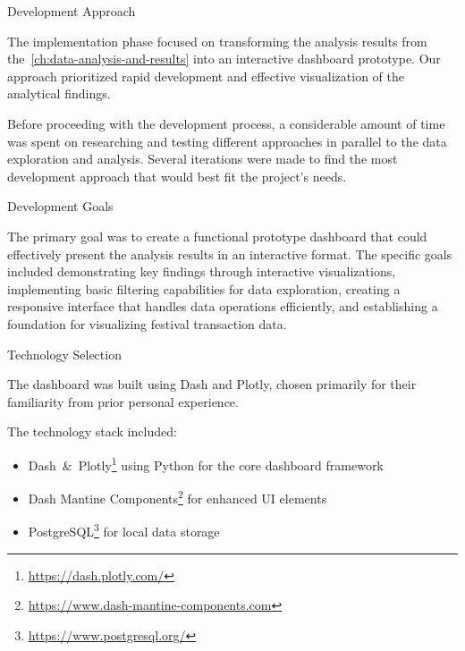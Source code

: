 \begin{section}{Development Approach}
	\label{sec:implementation-development-approach}

	The implementation phase focused on transforming the analysis results from the~\autoref{ch:data-analysis-and-results} into an interactive dashboard prototype.
	Our approach prioritized rapid development and effective visualization of the analytical findings.

	Before proceeding with the development process, a considerable amount of time was spent on researching and testing different approaches in parallel to the data exploration and analysis.
	Several iterations were made to find the most development approach that would best fit the project's needs.

	\begin{subsection}{Development Goals}
		\label{subsec:implementation-development-approach-goals}

		The primary goal was to create a functional prototype dashboard that could effectively present the analysis results in an interactive format.
		The specific goals included demonstrating key findings through interactive visualizations, implementing basic filtering capabilities for data exploration,
		creating a responsive interface that handles data operations efficiently, and establishing a foundation for visualizing festival transaction data.
	\end{subsection}

	\begin{subsection}{Technology Selection}
		\label{subsec:implementation-development-approach-technology}

		The dashboard was built using Dash and Plotly, chosen primarily for their familiarity from prior personal experience.

		The technology stack included:
		\begin{itemize}
			\item Dash~\&~Plotly\footnote{\url{https://dash.plotly.com/}} using Python for the core dashboard framework
			\item Dash Mantine Components\footnote{\url{https://www.dash-mantine-components.com}} for enhanced UI elements
			\item PostgreSQL\footnote{\url{https://www.postgresql.org/}} for local data storage
		\end{itemize}


\end{subsection}
\end{section}
